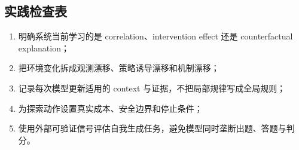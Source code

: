 \subsection{实践检查表}

\begin{enumerate}
    \item 明确系统当前学习的是 correlation、intervention effect 还是 counterfactual explanation；
    \item 把环境变化拆成观测漂移、策略诱导漂移和机制漂移；
    \item 记录每次模型更新适用的 context 与证据，不把局部规律写成全局规则；
    \item 为探索动作设置真实成本、安全边界和停止条件；
    \item 使用外部可验证信号评估自我生成任务，避免模型同时垄断出题、答题与判分。
\end{enumerate}
